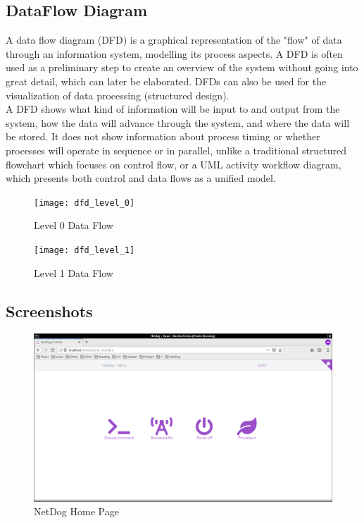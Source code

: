 \subsection{DataFlow Diagram}
A data flow diagram (DFD) is a graphical representation of the "flow" of data
through an information system, modelling its process aspects. A DFD is often
used as a preliminary step to create an overview of the system without going
into great detail, which can later be elaborated. DFDs can also be used for the
visualization of data processing (structured design).\\

A DFD shows what kind of information will be input to and output from the
system, how the data will advance through the system, and where the data will
be stored. It does not show information about process timing or whether
processes will operate in sequence or in parallel, unlike a traditional
structured flowchart which focuses on control flow, or a UML activity workflow
diagram, which presents both control and data flows as a unified model.

\begin{figure}[H]
\texttt{[image: dfd\_level\_0]}
\caption{Level 0 Data Flow}
\end{figure}

\begin{figure}[H]
\texttt{[image: dfd\_level\_1]}
\caption{Level 1 Data Flow}
\end{figure}

\subsection{Screenshots}

\begin{figure}[H]
\includegraphics[scale=0.3]{netdog_home}
\caption{NetDog Home Page}
\end{figure}

